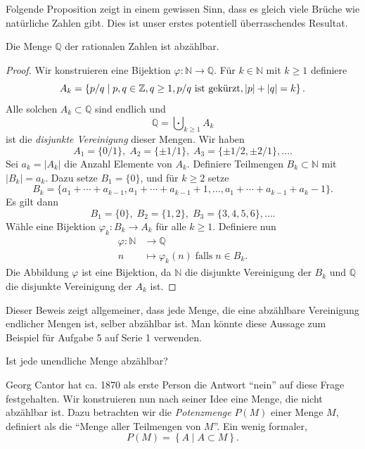 \documentclass[../main.tex]{subfiles}
\begin{document}
Folgende Proposition zeigt in einem gewissen Sinn, dass es gleich viele Brüche
wie natürliche Zahlen gibt. Dies ist unser erstes potentiell überraschendes
Resultat.

\begin{manualproposition}{1}\label{prop:q-countable}
  Die Menge $\mathbb Q$ der rationalen Zahlen ist abzählbar.
\end{manualproposition}


\begin{proof}
  Wir konstruieren eine Bijektion $\varphi \colon \mathbb N \to \mathbb Q$.
  Für $k \in \mathbb N$ mit $k \geq 1$ definiere
  \[
    A_{k} = \left\{p/q \mid p, q \in \mathbb Z, q \geq 1, p/q \textup{ ist gekürzt},
    |p| + |q| = k\right\}.
  \]
  Alle solchen $A_{k} \subset \mathbb Q$ sind endlich und
  \[
    \mathbb Q = \bigcupdot_{k \geq 1} A_{k}
  \]
  ist die \emph{disjunkte Vereinigung} dieser Mengen.
  Wir haben
  \[
    A_{1} = \{0/1\}, \; A_{2} = \{\pm 1/1\}, \; A_{3} = \{\pm 1/2, \pm 2/1\}, \dots.
  \]
  Sei $a_{k} = |A_{k}|$ die Anzahl Elemente von $A_{k}$.
  Definiere Teilmengen $B_{k} \subset \mathbb N$ mit $|B_{k}| = a_{k}$.
  Dazu setze $B_{1} = \{0\}$, und für $k \geq 2$ setze
  \[
    B_{k} = \{a_{1} + \cdots + a_{k-1},
    a_{1} + \cdots + a_{k-1} + 1, \dots,
    a_{1} + \cdots + a_{k-1} + a_{k} - 1\}.
  \]
  Es gilt dann
  \[
    B_{1} = \{0\}, \; B_{2} = \{1, 2\}, \; B_{3} = \{3, 4, 5, 6\}, \dots.
  \]
Wähle eine Bijektion $\varphi_{k} \colon B_{k} \to A_{k}$ für alle $k \geq 1$.
Definiere nun
\begin{align*}
  \varphi \colon \mathbb N &\to \mathbb Q \\
  n &\mapsto \varphi_{k}(n) \;\text{falls}\; n \in B_{k}.
\end{align*}
Die Abbildung $\varphi$ ist eine Bijektion, da $\mathbb N$ die disjunkte
Vereinigung der $B_{k}$ und $\mathbb Q$ die disjunkte Vereinigung
der $A_{k}$ ist.
\end{proof}

Dieser Beweis zeigt allgemeiner, dass jede Menge, die eine abzählbare Vereinigung
endlicher Mengen ist, selber abzählbar ist. Man könnte diese Aussage
zum Beispiel für Aufgabe 5 auf Serie 1 verwenden.

\begin{question}
  Ist jede unendliche Menge abzählbar?
\end{question}

Georg Cantor hat ca. 1870 als erste Person die Antwort ``nein'' auf diese Frage
festgehalten.
Wir konstruieren nun nach seiner Idee
eine Menge, die nicht abzählbar ist.
Dazu betrachten wir die \emph{Potenzmenge} $P(M)$
einer Menge $M$, definiert als die ``Menge aller Teilmengen von $M$''.
Ein wenig formaler,
\[P(M) = \left\{A \mid A \subset M\right\}.\]
\end{document}
